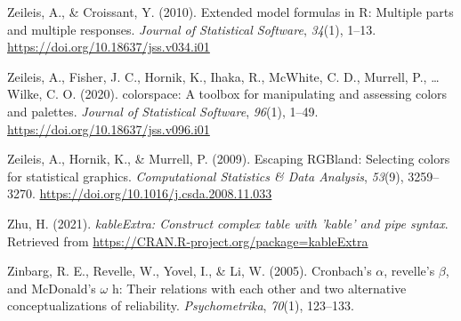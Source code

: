 \documentclass[
  english,
  man]{apa6}
\newlength{\cslhangindent}
\newlength{\cslentryspacingunit} %
\newenvironment{CSLReferences}[2] %
 {%
  \setlength{\parindent}{0pt}
  \ifodd #1
  \let\oldpar\par
  \def\par{\hangindent=\cslhangindent\oldpar}
  \fi
  \setlength{\parskip}{#2\cslentryspacingunit}
 }%
 {}
\begin{document}
\begin{CSLReferences}{1}{0}
\leavevmode{}%
Zeileis, A., \& Croissant, Y. (2010). Extended model formulas in {R}: Multiple parts and multiple responses. \emph{Journal of Statistical Software}, \emph{34}(1), 1--13. \url{https://doi.org/10.18637/jss.v034.i01}

\leavevmode{}%
Zeileis, A., Fisher, J. C., Hornik, K., Ihaka, R., McWhite, C. D., Murrell, P., \ldots{} Wilke, C. O. (2020). {colorspace}: A toolbox for manipulating and assessing colors and palettes. \emph{Journal of Statistical Software}, \emph{96}(1), 1--49. \url{https://doi.org/10.18637/jss.v096.i01}

\leavevmode{}%
Zeileis, A., Hornik, K., \& Murrell, P. (2009). Escaping {RGB}land: Selecting colors for statistical graphics. \emph{Computational Statistics \& Data Analysis}, \emph{53}(9), 3259--3270. \url{https://doi.org/10.1016/j.csda.2008.11.033}

\leavevmode{}%
Zhu, H. (2021). \emph{kableExtra: Construct complex table with 'kable' and pipe syntax}. Retrieved from \url{https://CRAN.R-project.org/package=kableExtra}

\leavevmode{}%
Zinbarg, R. E., Revelle, W., Yovel, I., \& Li, W. (2005). Cronbach's \(\alpha\), revelle's \(\beta\), and McDonald's \(\omega\) h: Their relations with each other and two alternative conceptualizations of reliability. \emph{Psychometrika}, \emph{70}(1), 123--133.

\end{CSLReferences}

\endgroup


\clearpage
\makeatletter
\efloat@restorefloats
\makeatother
\end{document}
